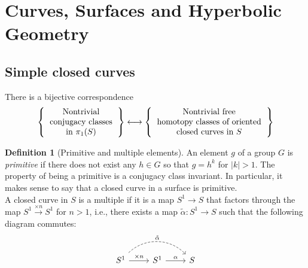 \documentclass[reqno]{amsart}
\theoremstyle{definition}
\newtheorem{definition}[theorem]{Definition}
\theoremstyle{remark}
\begin{document}
\section{Curves, Surfaces and Hyperbolic Geometry}
\subsection{Simple closed curves}
There is a bijective correspondence
\[
\left\{ 
    \begin{tabular}{c}
    Nontrivial\\
    conjugacy classes\\
    in $\pi_1 (S)$
\end{tabular}
\right\} 
\longleftrightarrow
\left\{ 
    \begin{tabular}{c}
        Nontrivial free\\
        homotopy classes of oriented\\
        closed curves in $S$
\end{tabular}
\right\} 
\] 

\begin{definition}[Primitive and multiple elements]
    An element $g$ of a group $G$ is \textit{primitive} if there
    does not exist any $h \in G$ so that $g = h^{k}$ for
    $\left| k \right| >1$. The property of being a primitive
    is a conjugacy class invariant. In particular, it makes
    sense to say that a closed curve in a surface is primitive.\\
    A closed curve in $S$ is a multiple if it is a map
    $S^{1} \to S$ that factors through the map
    $S^{1} \stackrel{\times n}{\to } S^{1}$ for
    $n >1$, i.e., there exists a map $\tilde{\alpha} \colon
    S^{1} \to S$ such that the following diagram commutes:
    \begin{equation*}
    \begin{tikzcd}
        S^{1} \ar[r, "\times n"] \ar[rr, bend left = 45, dashed,
        "\tilde{\alpha}"] & S^{1} \ar[r,
        "\alpha"] & S
    \end{tikzcd}
    \end{equation*}
\end{definition}
\end{document}
